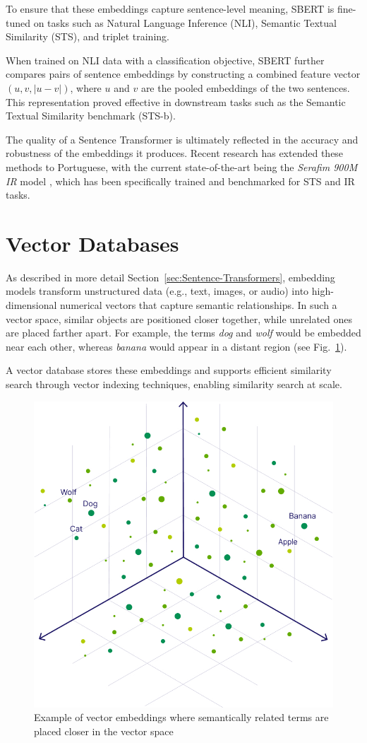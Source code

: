 To ensure that these embeddings capture sentence-level meaning, SBERT is fine-tuned on tasks such as Natural Language Inference (NLI), Semantic Textual Similarity (STS), and triplet training. 

When trained on NLI data with a classification objective, SBERT further compares pairs of sentence embeddings by constructing a combined feature vector $(u, v, |u-v|)$, where $u$ and $v$ are the pooled embeddings of the two sentences. This representation proved effective in downstream tasks such as the Semantic Textual Similarity benchmark (\gls{STS}-b).

The quality of a Sentence Transformer is ultimately reflected in the accuracy and robustness of the embeddings it produces. Recent research has extended these methods to Portuguese, with the current state-of-the-art being the \textit{Serafim 900M IR} model \cite{gomes2024opensentenceembeddingsportuguese}, which has been specifically trained and benchmarked for \gls{STS} and \gls{IR} tasks.

\section{Vector Databases}
\label{sec:vector-store}
As described in more detail Section~\ref{sec:Sentence-Transformers}, embedding models transform unstructured data (e.g., text, images, or audio) into high-dimensional numerical vectors that capture semantic relationships. In such a vector space, similar objects are positioned closer together, while unrelated ones are placed farther apart. For example, the terms \emph{dog} and \emph{wolf} would be embedded near each other, whereas \emph{banana} would appear in a distant region (see Fig.~\ref{fig:vector-embedding}).  

A vector database stores these embeddings and supports efficient similarity search through vector indexing techniques, enabling similarity search at scale.
\begin{figure}[h]
    \centering
    \includegraphics[width=0.55\linewidth]{Images/vector-embedding.jpg}
    \caption{Example of vector embeddings where semantically related terms are placed closer in the vector space \cite{weaviate}}
    \label{fig:vector-embedding}
\end{figure}

